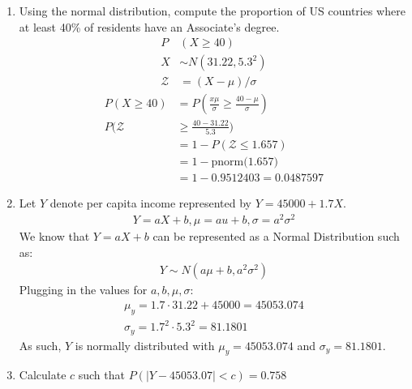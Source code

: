 \documentclass{article}
\begin{document}
\begin{enumerate}[label=\alph*)]
    \item Using the normal distribution, compute the proportion of US countries where at least 40\% of residents have an Associate's degree.
          \begin{align*}
              P           & (X \geq 40)          \\
              X           & \sim N(31.22, 5.3^2) \\
              \mathcal{Z} & = (X - \mu)/\sigma
          \end{align*}
          \begin{align*}
              P(X \geq 40)  & = P(\frac{x\mu}{\sigma} \geq \frac{40-\mu}{\sigma}) \\
              P(\mathcal{Z} & \geq\frac{40-31.22}{5.3})                           \\
                            & = 1 - P(\mathcal{Z} \leq 1.657)                     \\
                            & = 1 - \text{pnorm(1.657)}                           \\
                            & = 1 - 0.9512403 = 0.0487597
          \end{align*}
    \item Let \(Y\) denote per capita income represented by \(Y = 45000 + 1.7X\).
          \begin{align*}
              Y = aX+b, \mu = au+b, \sigma = a^2\sigma^2
          \end{align*}
          We know that \(Y = aX + b\) can be represented as a Normal Distribution such as:
          \begin{align*}
              Y \sim N(a\mu + b, a^2\sigma^2)
          \end{align*}
          Plugging in the values for \(a, b, \mu, \sigma\):
          \begin{align*}
              \mu_y = 1.7\cdot 31.22 + 45000 = 45053.074 \\
              \sigma_y = 1.7^2\cdot 5.3^2 = 81.1801
          \end{align*}
          As such, \(Y\) is normally distributed with \(\mu_y = 45053.074\) and \(\sigma_y = 81.1801\).
    \item Calculate \(c\) such that \(P(|Y-45053.07| < c) = 0.758\)

\end{enumerate}
\end{document}
